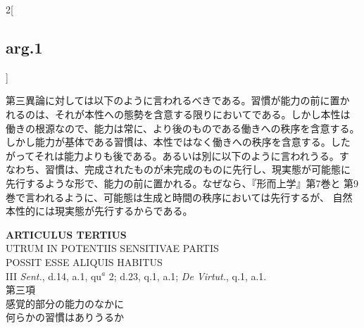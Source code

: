 \documentclass[paper=a4paper,fontsize=10pt,jafontsize=9pt,titlepage]{jlreq}
\begin{document}
\begin{paracol}{2}[\subsection{arg.1}]
\switchcolumn

第三異論に対しては以下のように言われるべきである。習慣が能力の前に置か
れるのは、それが本性への態勢を含意する限りにおいてである。しかし本性は
働きの根源なので、能力は常に、より後のものである働きへの秩序を含意する。
しかし能力が基体である習慣は、本性ではなく働きへの秩序を含意する。した
がってそれは能力よりも後である。あるいは別に以下のように言われうる。す
なわち、習慣は、完成されたものが未完成のものに先行し、現実態が可能態に
先行するような形で、能力の前に置かれる。なぜなら、『形而上学』第7巻と
第9巻で言われるように、可能態は生成と時間の秩序においては先行するが、
自然本性的には現実態が先行するからである。

\end{paracol}
\newpage





{}
\setcounter{section}{3}
\setcounter{subsection}{0}
\begin{center}
{\Large {\bfseries ARTICULUS TERTIUS}}\\
{\large UTRUM IN POTENTIIS SENSITIVAE PARTIS\\POSSIT ESSE ALIQUIS HABITUS}\\
{\footnotesize III {\itshape Sent.}, d.14, a.1, qu$^{a}$ 2; d.23, q.1, a.1; {\itshape De Virtut.}, q.1, a.1.}\\
{\Large 第三項\\感覚的部分の能力のなかに\\何らかの習慣はありうるか}
\end{center}
\end{document}
